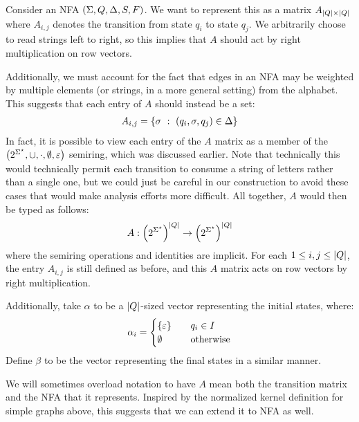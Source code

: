 \documentclass[12pt]{article}
\begin{document}
Consider an NFA \(\left(\Sigma, Q, \Delta, S, F\right)\).
We want to represent this as a matrix \(A_{\left\lvert Q\right\rvert \times \left\lvert Q\right\rvert}\)
where \(A_{i, j}\) denotes the transition from state \(q_i\)
to state \(q_j\).
We arbitrarily choose to read strings left to right, so this implies that
\(A\) should act by right multiplication on row vectors.

Additionally, we must account for the fact that edges in an NFA
may be weighted by multiple elements (or strings, in a more general setting)
from the alphabet.
This suggests that each entry of \(A\) should instead be a set:
\begin{align}
  A_{i, j} =
    \left\{\sigma \  : \  \left(q_i, \sigma, q_j\right) \in \Delta\right\}
\end{align}
In fact, it is possible to view each entry of the \(A\) matrix
as a member of the
\(\left(2^{\Sigma^\star}, \cup, \cdot, \emptyset, \varepsilon\right)\)
semiring, which was discussed earlier.
Note that technically this would technically permit each transition
to consume a string of letters rather than a single one,
but we could just be careful in our construction to avoid
these cases that would make analysis efforts more difficult.
All together, \(A\) would then be typed as follows:
\begin{align}
  A : \left(2^{\Sigma^\star}\right)^{\left\lvert Q\right\rvert} \to \left(2^{\Sigma^\star}\right)^{\left\lvert Q\right\rvert}
\end{align}
where the semiring operations and identities are implicit.
For each \(1 \leq i, j \leq \left\lvert Q\right\rvert\),
the entry \(A_{i, j}\) is still defined as before,
and this \(A\) matrix acts on row vectors by right multiplication.

Additionally, take \(\alpha\) to be a \(\left\lvert Q\right\rvert\)-sized vector
representing the initial states, where:
\begin{align}
  \alpha_i =
    \begin{cases}
      \left\{\varepsilon\right\} &\quad q_i \in I \\
      \emptyset &\quad \text{otherwise}
    \end{cases}
\end{align}
Define \(\beta\) to be the vector representing the final states
in a similar manner.

We will sometimes overload notation to have \(A\) mean both the transition
matrix and the NFA that it represents.
Inspired by the normalized kernel definition for simple graphs above,
this suggests that we can extend it to NFA as well.
\end{document}
